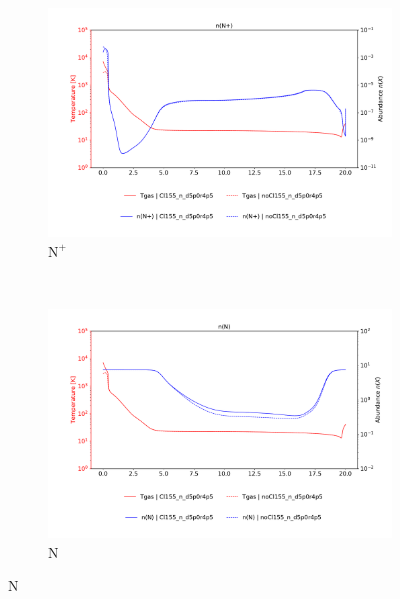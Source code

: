 \begin{figure}[!htbp]
    \centering
    \begin{subfigure}[t]{0.45\textwidth} %
        \centering \includegraphics[trim = {0 0 0 1.5cm},clip,width=1\textwidth]{figure/Cl/gridModelEmiss/nT_comp_Np.pdf}
        \caption{$\mathrm{N}^+$}
    \end{subfigure}
    ~ 
   \begin{subfigure}[t]{0.45\textwidth} %
        \centering \includegraphics[trim = {0 0 0 1.5cm},clip,width=1\textwidth]{figure/Cl/gridModelEmiss/nT_comp_N.pdf}
        \caption{$\mathrm{N}$}
    \end{subfigure}
    

\end{figure}
